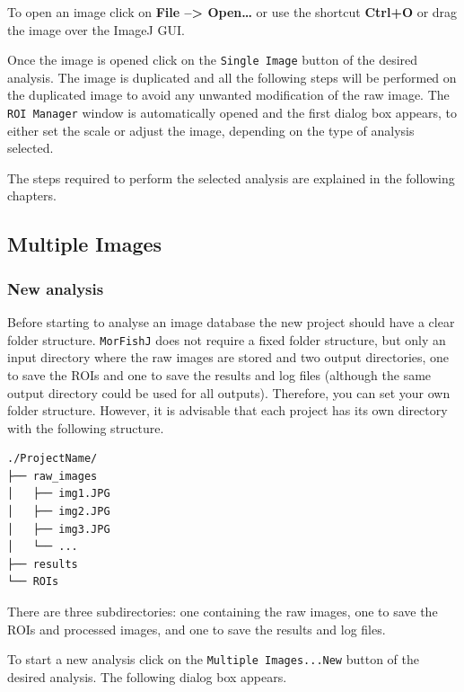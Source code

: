 \documentclass[
  letterpaper,
]{scrbook}
\begin{document}
To open an image click on \textbf{File --\textgreater{} Open\ldots{}} or
use the shortcut \textbf{Ctrl+O} or drag the image over the ImageJ GUI.

Once the image is opened click on the \texttt{Single\ Image} button of
the desired analysis. The image is duplicated and all the following
steps will be performed on the duplicated image to avoid any unwanted
modification of the raw image. The \texttt{ROI\ Manager} window is
automatically opened and the first dialog box appears, to either set the
scale or adjust the image, depending on the type of analysis selected.

The steps required to perform the selected analysis are explained in the
following chapters.

\hypertarget{multiple-images}{%
\subsection{Multiple Images}\label{multiple-images}}

\hypertarget{new-analysis}{%
\subsubsection*{New analysis}\label{new-analysis}}

Before starting to analyse an image database the new project should have
a clear folder structure. \texttt{MorFishJ} does not require a fixed
folder structure, but only an input directory where the raw images are
stored and two output directories, one to save the ROIs and one to save
the results and log files (although the same output directory could be
used for all outputs). Therefore, you can set your own folder structure.
However, it is advisable that each project has its own directory with
the following structure.

\begin{verbatim}
./ProjectName/
├── raw_images
│   ├── img1.JPG
│   ├── img2.JPG
│   ├── img3.JPG
│   └── ...
├── results
└── ROIs
\end{verbatim}

There are three subdirectories: one containing the raw images, one to
save the ROIs and processed images, and one to save the results and log
files.

To start a new analysis click on the \texttt{Multiple\ Images...New}
button of the desired analysis. The following dialog box appears.
\end{document}
